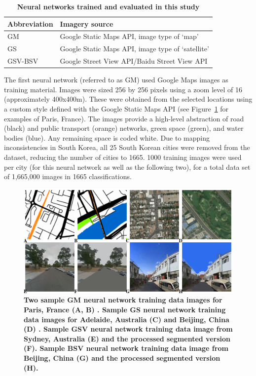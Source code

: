 \documentclass[Crown,sageh,times]{sagej}
\begin{document}
\begin{table}[!htbp]
\caption{\bf Neural networks trained and evaluated in this study \label{tab:neuralnetworks}}     
\begin{tabular}{ l l }
 \hline Abbreviation   &  Imagery source \\ \hline
GM & Google Static Maps API, image type of `map'     \\ 
GS & Google Static Maps API, image type of `satellite'      \\
GSV-BSV & Google Street View API/Baidu Street View API     \\ \hline

\end{tabular}
\end{table}

The first neural network (referred to as GM) used Google Maps images as training material. Images were sized 256 by 256 pixels using a zoom level of 16 (approximately 400x400m). These were obtained from the selected locations using a custom style defined with the Google Static Maps API \citep{GoogleStatic2017} (see Figure~\ref{fig:maps} for examples of Paris, France). The images provide a high-level abstraction of road (black) and public transport (orange) networks, green space (green), and water bodies (blue). Any remaining space is coded white. Due to mapping inconsistencies in South Korea, all 25 South Korean cities were removed from the dataset, reducing the number of cities to 1665. 1000 training images were used per city (for this neural network as well as the following two), for a total data set of 1,665,000 images in 1665 classifications. 



\begin{figure}[!htbp]
    \centering    
\includegraphics[scale=0.5]{Images/Figure2Maps_2.png}  
\caption{\bf Two sample GM neural network training data images for Paris, France (A, B) \citep{GoogleStatic2017}. Sample GS neural network training data images for Adelaide, Australia (C) and Beijing, China (D) \citep{GoogleStatic2017}. Sample GSV neural network training data image from Sydney, Australia (E) \citep{GoogleMaps2017b} and the processed segmented version (F). Sample BSV neural network training data image from Beijing, China (G) \citep{Baidu2017} and the processed segmented version (H).}    
 \label{fig:maps}  
\end{figure} 
\end{document}
